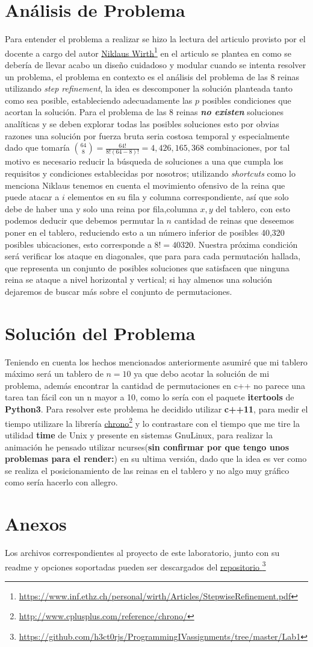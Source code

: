 \documentclass[paper=a4, fontsize=12pt]{article} 		%
\newcommand\fnurl[2]{%
\href{#2}{#1}\footnote{\url{#2}}%
}
\numberwithin{equation}{section}						%
\numberwithin{table}{section} 							%
\begin{document}
\section{Análisis de Problema}
Para entender el problema a realizar se hizo la lectura del articulo provisto por el docente a cargo del autor \fnurl{Niklaus Wirth}{https://www.inf.ethz.ch/personal/wirth/Articles/StepwiseRefinement.pdf} en el articulo se plantea en como se debería de llevar acabo un diseño cuidadoso y modular cuando se intenta resolver un problema, el problema en contexto es el análisis del problema de las 8 reinas utilizando \emph{step refinement}, la idea es descomponer la solución planteada tanto como sea posible, estableciendo adecuadamente las $p$ posibles condiciones que acortan la solución. Para el problema de las 8 reinas \textbf{\textit{no existen}} soluciones analíticas y se deben explorar todas las posibles soluciones esto por obvias razones una solución por fuerza bruta seria costosa temporal y especialmente dado que tomaría $ \binom {64} {8}=\frac { 64! }{ 8!(64-8)! } =4,426,165,368$ combinaciones, por tal motivo es necesario reducir la búsqueda de soluciones a una que cumpla los requisitos y condiciones establecidas por nosotros; utilizando \textit{shortcuts} como lo menciona Niklaus tenemos en cuenta el movimiento ofensivo de la reina que puede atacar a $i$ elementos en su fila y columna correspondiente, así que solo debe de haber una y solo una reina por fila,columna $x,y$ del tablero, con esto podemos deducir que debemos permutar la $n$ cantidad de reinas que deseemos poner en el tablero, reduciendo esto a un número inferior de posibles 40,320 posibles ubicaciones, esto corresponde a $8!=40320$. Nuestra próxima condición será verificar los ataque en diagonales, que para para cada  permutación hallada, que representa un conjunto de posibles soluciones que satisfacen que ninguna reina se ataque a nivel horizontal y vertical; si hay almenos una solución dejaremos de buscar más sobre el conjunto de permutaciones. 

\section{Solución del Problema}
Teniendo en cuenta los hechos mencionados anteriormente asumiré que mi tablero máximo será un tablero de $n=10$ ya que debo acotar la solución de mi problema, además encontrar la cantidad de permutaciones en c++ no parece una tarea tan fácil con un n mayor a 10, como lo sería con el paquete \textbf{itertools} de \textbf{Python3}. Para resolver este problema he decidido utilizar \textbf{c++11}, para medir el tiempo utilizare la librería \fnurl{chrono}{http://www.cplusplus.com/reference/chrono/} y lo contrastare con el tiempo que me tire la utilidad \textbf{time} de Unix y presente en sistemas Gnu\/Linux, para realizar la animación he pensado utilizar ncurses(\textbf{sin confirmar por que tengo unos problemas para el render:\/}) en su ultima versión, dado que la idea es ver como se realiza el posicionamiento de las reinas en el tablero y no algo muy gráfico como sería hacerlo con allegro. 
\section{Anexos}
Los archivos correspondientes al proyecto de este laboratorio, junto con su readme y opciones soportadas pueden ser descargados del \fnurl{repositorio }{https://github.com/h3ct0rjs/ProgrammingIVassignments/tree/master/Lab1}
\end{document}
